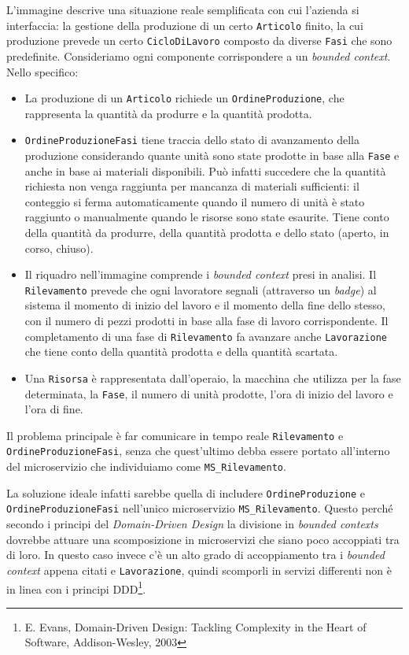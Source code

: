         \vspace{0.2 em}
        \noindent L'immagine descrive una situazione reale semplificata con cui l'azienda si interfaccia: la gestione della produzione di un certo \texttt{Articolo} finito, la cui produzione prevede un certo \texttt{CicloDiLavoro} composto da diverse \texttt{Fasi} che sono predefinite. Consideriamo ogni componente corrispondere a un \textit{bounded context}.
        Nello specifico: 
        \begin{itemize}
            \item La produzione di un \texttt{Articolo} richiede un \texttt{OrdineProduzione}, che rappresenta la quantità da produrre e la quantità prodotta.
            \item \texttt{OrdineProduzioneFasi} tiene traccia dello stato di avanzamento della produzione considerando quante unità sono state prodotte in base alla \texttt{Fase} e anche in base ai materiali disponibili. Può infatti succedere che la quantità richiesta non venga raggiunta per mancanza di materiali sufficienti: il conteggio si ferma automaticamente quando il numero di unità è stato raggiunto o manualmente quando le risorse sono state esaurite. Tiene conto della quantità da produrre, della quantità prodotta e dello stato (aperto, in corso, chiuso).
            \item Il riquadro nell'immagine comprende i \textit{bounded context} presi in analisi. Il \texttt{Rilevamento} prevede che ogni lavoratore segnali (attraverso un \textit{badge}) al sistema il momento di inizio del lavoro e il momento della fine dello stesso, con il numero di pezzi prodotti in base alla fase di lavoro corrispondente. Il completamento di una fase di \texttt{Rilevamento} fa avanzare anche \texttt{Lavorazione} che tiene conto della quantità prodotta e della quantità scartata.
            \item Una \texttt{Risorsa} è rappresentata dall'operaio, la macchina che utilizza per la fase determinata, la \texttt{Fase}, il numero di unità prodotte, l'ora di inizio del lavoro e l'ora di fine.
        \end{itemize}

        \vspace{0.2 em}
        \noindent Il problema principale è far comunicare in tempo reale \texttt{Rilevamento} e \texttt{OrdineProduzioneFasi}, senza che quest'ultimo debba essere portato all'interno del microservizio che individuiamo come \texttt{MS\_Rilevamento}.

        \vspace{0.2 em}
        \noindent La soluzione ideale infatti sarebbe quella di includere \texttt{OrdineProduzione} e \texttt{OrdineProduzioneFasi} nell'unico microservizio \texttt{MS\_Rilevamento}. Questo perché secondo i principi del \textit{Domain-Driven Design} la divisione in \textit{bounded contexts} dovrebbe attuare una scomposizione in microservizi che siano poco accoppiati tra di loro. In questo caso invece c'è un alto grado di accoppiamento tra i \textit{bounded context} appena citati e  \texttt{Lavorazione}, quindi scomporli in servizi differenti non è in linea con i principi DDD\footnote{E. Evans, Domain-Driven Design: Tackling Complexity in the Heart of Software, Addison-Wesley, 2003}.

